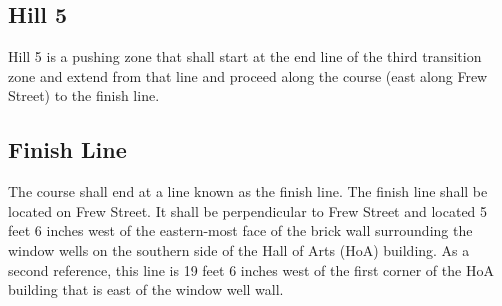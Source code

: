 \subsection{Hill 5}

	Hill 5 is a pushing zone that shall start at the end line of the third transition zone and extend from that line and proceed along the course (east along Frew Street) to the finish line.

\subsection{Finish Line}

	The course shall end at a line known as the finish line. The finish line shall be located on Frew Street. It shall be perpendicular to Frew Street and located 5 feet 6 inches west of the eastern-most face of the brick wall surrounding the window wells on the southern side of the Hall of Arts (HoA) building. As a second reference, this line is 19 feet 6 inches west of the first corner of the HoA building that is east of the window well wall.
